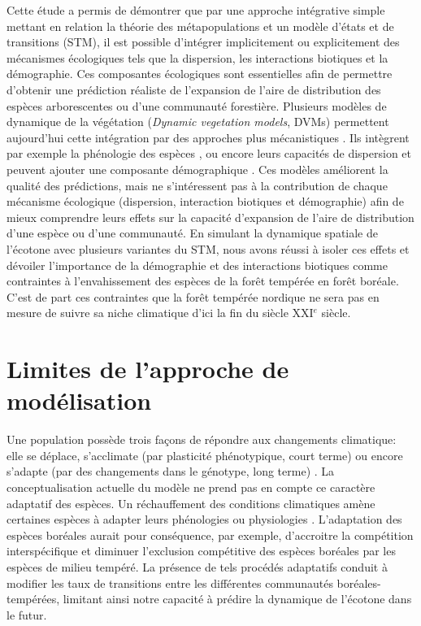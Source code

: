 
Cette étude a permis de démontrer que par une approche intégrative simple mettant en relation la
théorie des métapopulations et un modèle d'états et de transitions (STM), il est possible d'intégrer
implicitement ou explicitement des mécanismes écologiques tels que la dispersion, les interactions
biotiques et la démographie. Ces composantes écologiques sont essentielles afin de permettre
d'obtenir une prédiction réaliste de l'expansion de l'aire de distribution des espèces arborescentes
ou d'une communauté forestière. Plusieurs modèles de dynamique de la végétation (\textit{Dynamic
vegetation models}, DVMs) permettent aujourd'hui cette intégration par des approches plus
mécanistiques \citep{Snell2014a}. Ils intègrent par exemple la phénologie des espèces
\citep{Letters2001,Morin2008}, ou encore leurs capacités de dispersion \citep{Nobis2014,Iverson2004}
et peuvent ajouter une composante démographique \citep{Lischke2006a,Vanderwel2014}. Ces modèles
améliorent la qualité des prédictions, mais ne s'intéressent pas à la contribution de chaque
mécanisme écologique (dispersion, interaction biotiques et démographie) afin de mieux comprendre
leurs effets sur la capacité d'expansion de l'aire de distribution d'une espèce ou d'une
communauté. En simulant la dynamique spatiale de l'écotone avec plusieurs variantes du STM, nous
avons réussi à isoler ces effets et dévoiler l'importance de la démographie et des interactions
biotiques comme contraintes à l'envahissement des espèces de la forêt tempérée en forêt boréale.
C'est de part ces contraintes que la forêt tempérée nordique ne sera pas en mesure de suivre sa
niche climatique d'ici la fin du siècle XXI$^e$ siècle.

\section*{Limites de l'approche de modélisation}

Une population possède trois façons de répondre aux  changements climatique: elle se déplace,
s'acclimate (par plasticité phénotypique, court terme) ou encore s'adapte (par des changements dans
le génotype, long terme) \citep{Corlett2013}. La conceptualisation actuelle du modèle ne prend pas
en compte ce caractère adaptatif des espèces. Un réchauffement des conditions climatiques amène
certaines espèces à adapter leurs phénologies ou physiologies \citep{Saxe2001,Davis2001}.
L'adaptation des espèces boréales aurait pour conséquence, par exemple, d'accroitre la compétition
interspécifique et diminuer l'exclusion compétitive des espèces boréales par les espèces de milieu
tempéré. La présence de tels procédés adaptatifs conduit à modifier les taux de transitions entre
les différentes communautés boréales-tempérées, limitant ainsi notre capacité à prédire la dynamique
de l'écotone dans le futur.

